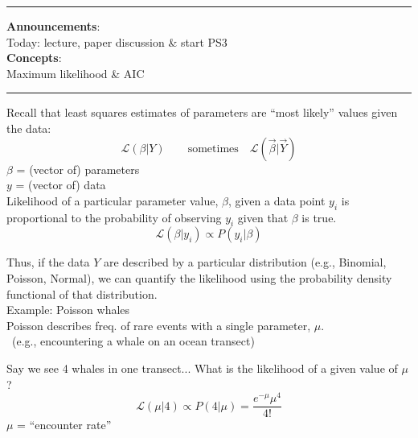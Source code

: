 \documentclass{article}
\newcommand{\ind}{\-\hspace{1cm}}
\begin{document}
\noindent{}

\rule[0.5ex]{\linewidth}{1pt}
\textbf{Announcements}:\\
\ind Today: lecture, paper discussion \& start PS3\\
\textbf{Concepts}: \\
\ind Maximum likelihood \& AIC\\
\rule[0.5ex]{\linewidth}{1pt}
Recall that least squares estimates of parameters are ``most likely'' values given the data:\\
\begin{equation*}
	\mathcal{L}(\beta \vert Y) \quad \quad \text{sometimes} \quad \mathcal{L}(\vec{\beta} \vert \vec{Y})
\end{equation*}
\ind $\beta$ = (vector of) parameters\\
\ind $y$ = (vector of) data\\

Likelihood of a particular parameter value, $\beta$, given a data point $y_i$ is proportional to the probability of observing $y_i$ given that $\beta$ is true.
\begin{equation*}
	\mathcal{L}(\beta \vert y_i) \propto P(y_i\vert \beta)
\end{equation*}

Thus, if the data $Y$ are described by a particular distribution (e.g., Binomial, Poisson, Normal), we can quantify the likelihood using the probability density functional of that distribution.\\

Example:  Poisson whales\\
Poisson describes freq. of rare events with a single parameter, $\mu$.\\\
\ind (e.g., encountering a whale on an ocean transect)

Say we see 4 whales in one transect...
What is the likelihood of a given value of $\mu$?
\begin{equation*}
	\mathcal{L}(\mu \vert 4) \propto P(4 \vert \mu) = \frac{e^{-\mu}\mu^4}{4!}
\end{equation*}
$\mu$ = ``encounter rate''\\
\end{document}
